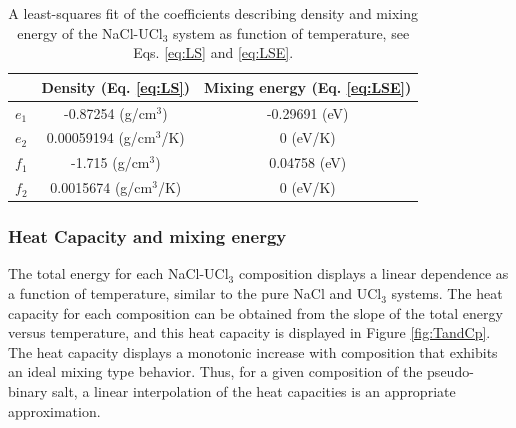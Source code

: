 \documentclass[preprint,3p,10pt,onecolumn,number,sort&compress]{elsarticle}
\begin{document}
{%


\begin{table}[hb!]
\centering
\begin{tabular}{lcc}
\hline
\hline
&Density (Eq. \ref{eq:LS}) &Mixing energy (Eq. \ref{eq:LSE}) \\
\hline
$e_1$ &-0.87254 (g/cm$^3$) &-0.29691 (eV) \\
$e_2$ &0.00059194 (g/cm$^3$/K) &0 (eV/K)\\
$f_1$ &-1.715 (g/cm$^3$) &0.04758 (eV) \\
$f_2$ &0.0015674 (g/cm$^3$/K) &0 (eV/K)\\
\hline
\hline
\end{tabular}
\caption{A least-squares fit of the coefficients describing density and mixing energy of the NaCl-UCl$_3$ system as function of temperature, see Eqs. \ref{eq:LS} and \ref{eq:LSE}.}%
\label{table:LS}
\end{table}

\FloatBarrier

\subsubsection{Heat Capacity and mixing energy}
The total energy for each NaCl-UCl$_3$ composition displays a linear dependence as a function of temperature, similar to the pure NaCl and UCl$_3$ systems. The heat capacity for each composition can be obtained from the slope of the total energy versus temperature, and this heat capacity is displayed in Figure \ref{fig:TandCp}. The heat capacity displays a monotonic increase with composition that exhibits an ideal mixing type behavior. Thus, for a given composition of the pseudo-binary salt, a linear interpolation of the heat capacities is an appropriate approximation. 

}
\end{document}
